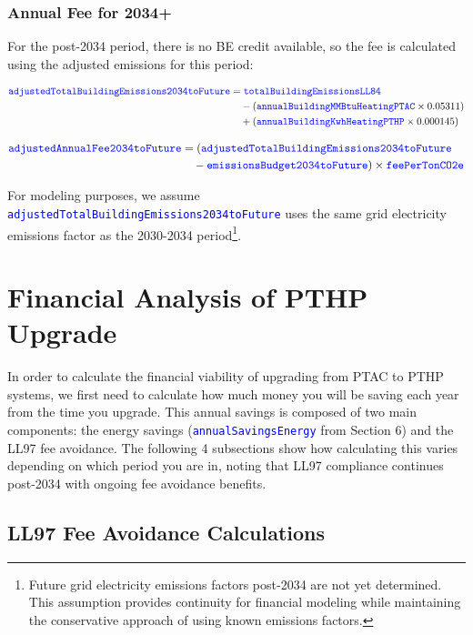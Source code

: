 \documentclass{article}
\newcommand{\code}[1]{\textcolor{blue}{\texttt{#1}}}
\begin{document}
\subsubsection{Annual Fee for 2034+}

For the post-2034 period, there is no BE credit available, so the fee is calculated using the adjusted emissions for this period:

\begin{align}
\code{adjustedTotalBuildingEmissions2034toFuture} &= \code{totalBuildingEmissionsLL84} \nonumber \\
&\quad - (\code{annualBuildingMMBtuHeatingPTAC} \times 0.05311) \nonumber \\
&\quad + (\code{annualBuildingKwhHeatingPTHP} \times 0.000145)
\end{align}

\begin{align}
\code{adjustedAnnualFee2034toFuture} &= (\code{adjustedTotalBuildingEmissions2034toFuture} \nonumber\\
&\quad - \code{emissionsBudget2034toFuture}) \times \code{feePerTonCO2e}
\end{align}

For modeling purposes, we assume \code{adjustedTotalBuildingEmissions2034toFuture} uses the same grid electricity emissions factor as the 2030-2034 period\footnote{Future grid electricity emissions factors post-2034 are not yet determined. This assumption provides continuity for financial modeling while maintaining the conservative approach of using known emissions factors.}.


\section{Financial Analysis of PTHP Upgrade}

In order to calculate the financial viability of upgrading from PTAC to PTHP systems, we first need to calculate how much money you will be saving each year from the time you upgrade. This annual savings is composed of two main components: the energy savings (\code{annualSavingsEnergy} from Section 6) and the LL97 fee avoidance. The following 4 subsections show how calculating this varies depending on which period you are in, noting that LL97 compliance continues post-2034 with ongoing fee avoidance benefits.

\subsection{LL97 Fee Avoidance Calculations}
\end{document}
